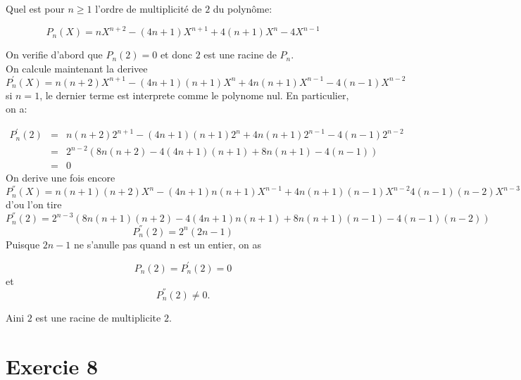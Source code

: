 \documentclass{report}
\begin{document}
{
Quel est pour $n\geq 1$ l'ordre de multiplicité de $2$ du polynôme:

$$
P_n(X)= n X^{n+2}-(4n+1)X^{n+1}+4(n+1)X^n-4X^{n-1}
$$
}
\begin{myproof}
  On verifie d'abord que $P_n(2)= 0$ et donc $2$ est une racine de $P_n$.\\

  On calcule maintenant la derivee 
  $$
  P^{'}_n(X) = n(n+2)X^{n+1} - (4n+1)(n+1)X^n + 4n(n+1)X^{n-1} - 4(n-1)X^{n-2}
  $$
  si $n=1$, le dernier terme est interprete comme le polynome nul. En particulier, on a:

  \begin{eqnarray}
    P^{'}_n(2)&=& n(n+2)2^{n+1} - (4n+1)(n+1)2^n + 4n(n+1)2^{n-1} -4(n-1)2^{n-2}\\[4pt]
              &=& 2^{n-2}\left(8n(n+2) -4(4n+1)(n+1) + 8n(n+1) - 4(n-1)\right)\\[4pt]
              &=&0
  \end{eqnarray}
  On derive une fois encore
  $$
  P^{''}_n(X) = n(n+1)(n+2)X^n -(4n+1)n(n+1)X^{n-1} + 4n(n+1)(n-1)X^{n-2} 4(n-1)(n-2)X^{n-3}
  $$
  d'ou l'on tire 
  $$
  P^{''}_n(2) = 2^{n-3}\left(8n(n+1)(n+2) - 4(4n+1)n(n+1)+ 8n(n+1)(n-1) -4(n-1)(n-2)\right)
  $$
  $$
P^{''}_n(2) = 2^n(2n-1)
  $$
  Puisque $2n-1$ ne s'anulle pas quand n est un entier, on as 

  $$
  P_n(2) = P^{'}_n(2) = 0
  $$
  et 
  $$
  P^{''}_n(2) \ne 0.
  $$

  Aini $2$ est une racine de multiplicite $2$.
\end{myproof}

\newpage
\section{Exercie 8} %
\label{sec:Exercie 8}
\end{document}
